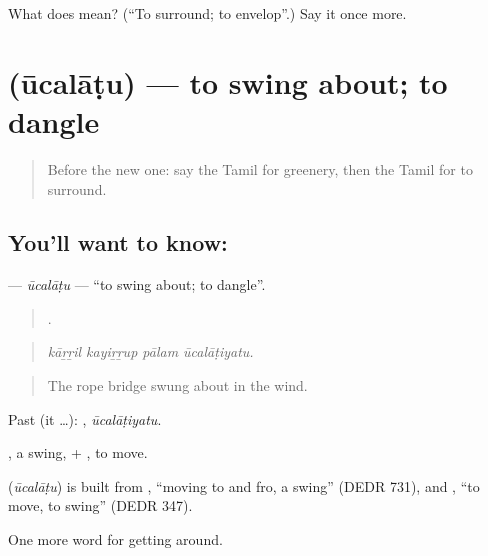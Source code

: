 \begin{tcolorbox}[breakable,colback=teal!4,colframe=teal!35!black,title={Before you move on}]
What does  mean? (\textquotedblleft{}To surround; to envelop\textquotedblright{}.) Say it once more.
\end{tcolorbox}
\section[\texorpdfstring{\ta{ஊசலாடு} (ūcalāṭu)}{ஊசலாடு (ūcalāṭu)}]{ (ūcalāṭu) — to swing about; to dangle}

\label{lesson:TA-C442-ucalatu}



\begin{quote}
Before the new one: say the Tamil for greenery, then the Tamil for to surround.
\end{quote}

\subsection*{You'll want to know: }
\textbf{} — \emph{ūcalāṭu} — \textquotedblleft{}to swing about; to dangle\textquotedblright{}.

\begin{quote}
   .
\end{quote}

\begin{quote}
\emph{kāṟṟil kayiṟṟup pālam ūcalāṭiyatu.}
\end{quote}

\begin{quote}
The rope bridge swung about in the wind.
\end{quote}

Past (it …): , \emph{ūcalāṭiyatu}.

, a swing, + , to move.

\begin{cousinweb}
\textbf{} (\emph{ūcalāṭu}) is built from , \textquotedblleft{}moving to and fro, a swing\textquotedblright{} (DEDR 731), and , \textquotedblleft{}to move, to swing\textquotedblright{} (DEDR 347).
\end{cousinweb}

\begin{grammarlens}[title={What you've built}]
One more word for getting around.
\end{grammarlens}


